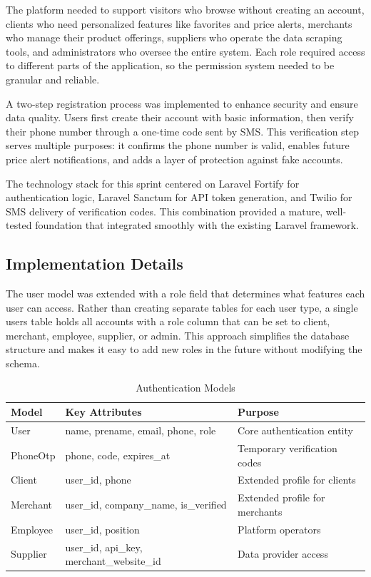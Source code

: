 The platform needed to support visitors who browse without
creating an account, clients who need personalized features like
favorites and price alerts, merchants who manage their product
offerings, suppliers who operate the data scraping tools, and
administrators who oversee the entire system. Each role required
access to different parts of the application, so the permission
system needed to be granular and reliable.

A two-step registration process was implemented to enhance
security and ensure data quality. Users first create their
account with basic information, then verify their phone number
through a one-time code sent by SMS. This verification step
serves multiple purposes: it confirms the phone number is valid,
enables future price alert notifications, and adds a layer of
protection against fake accounts.

The technology stack for this sprint centered on Laravel Fortify
for authentication logic, Laravel Sanctum for API token generation,
and Twilio for SMS delivery of verification codes. This
combination provided a mature, well-tested foundation that
integrated smoothly with the existing Laravel framework.

\subsection*{Implementation Details}

The user model was extended with a role field that determines
what features each user can access. Rather than creating separate
tables for each user type, a single users table holds all
accounts with a role column that can be set to client, merchant,
employee, supplier, or admin. This approach simplifies the
database structure and makes it easy to add new roles in the
future without modifying the schema.

\begin{table}[H]
\begin{center}
\begin{tabular}{|m{3cm}|m{6cm}|m{4cm}|}
\hline
\textbf{Model} & \textbf{Key Attributes} & \textbf{Purpose} \\ \hline
User & name, prename, email, phone, role & Core authentication entity \\ \hline
PhoneOtp & phone, code, expires\_at & Temporary verification codes \\ \hline
Client & user\_id, phone & Extended profile for clients \\ \hline
Merchant & user\_id, company\_name, is\_verified & Extended profile for merchants \\ \hline
Employee & user\_id, position & Platform operators \\ \hline
Supplier & user\_id, api\_key, merchant\_website\_id & Data provider access \\ \hline
\end{tabular}
\caption{Authentication Models}
\label{tab:auth_models}
\end{center}
\end{table}

